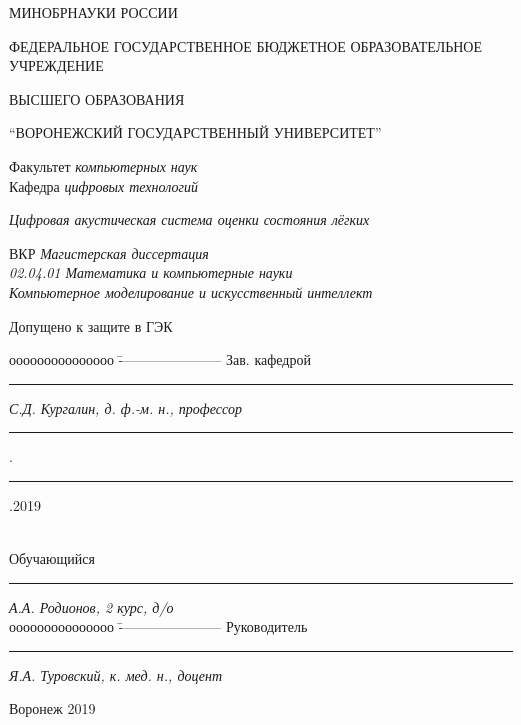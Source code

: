 \documentclass[../main.tex]{subfiles}
\begin{document}
\begin{spacing}{1.2}
{
\sffamily 
\begin{small}
\thispagestyle{empty}
\center
\begin{singlespace}
МИНОБРНАУКИ РОССИИ\\
\begin{bfseries}
ФЕДЕРАЛЬНОЕ ГОСУДАРСТВЕННОЕ БЮДЖЕТНОЕ ОБРАЗОВАТЕЛЬНОЕ УЧРЕЖДЕНИЕ

ВЫСШЕГО ОБРАЗОВАНИЯ

``ВОРОНЕЖСКИЙ ГОСУДАРСТВЕННЫЙ УНИВЕРСИТЕТ''
\end{bfseries}
\end{singlespace}

\vspace{0.5cm}
{Факультет \textit{компьютерных наук}}\\
{Кафедра \textit{цифровых технологий}}\\

\vspace{1.5cm}

\textit{Цифровая акустическая система оценки состояния лёгких}\\

\vspace{1.5cm}

{ВКР} \textit{Магистерская диссертация}\\
\textit{02.04.01 Математика и компьютерные науки}\\
\textit{Компьютерное моделирование и искусственный интеллект}\\

\vspace{2cm}
\begin{flushleft}
{Допущено к защите в ГЭК}
\end{flushleft}
\begin{tabbing}
ооооооооооооооо	\=	----------------------	\kill
Зав. кафедрой\> 	\rule[0mm]{3cm}{0,3mm}	\textit{С.Д. Кургалин, д. ф.-м. н., профессор}{ \rule[0mm]{5mm}{0,3mm}.\rule[0mm]{5mm}{0,3mm}.2019}  \\
Обучающийся \> 	\rule[0mm]{3cm}{0,3mm}	\textit{А.А. Родионов, 2 курс, д/о} \\ 
ооооооооооооооо	\=	----------------------	\kill
Руководитель\> 	\rule[0mm]{3cm}{0,3mm}  \textit{Я.А. Туровский, к. мед. н., доцент }
\end{tabbing}

\vspace{4cm}

\centerline{Воронеж 2019}
\end{small}
}
\end{spacing}
\clearpage
\end{document}

